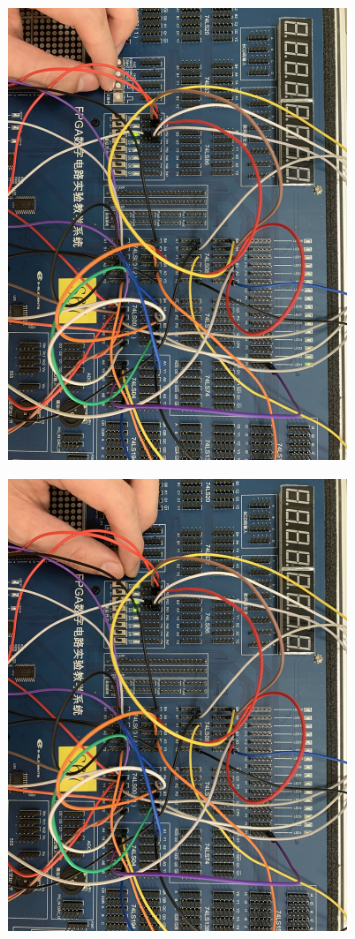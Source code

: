 \documentclass[UTF8, a4paper, 11pt]{article}
\begin{document}
\begin{figure}[H]
    \centering
    \includegraphics[width=0.8\textwidth]{1100.JPG}
\end{figure}
\begin{figure}[H]
    \centering
    \includegraphics[width=0.8\textwidth]{1101.JPG}
\end{figure}
\end{document}
